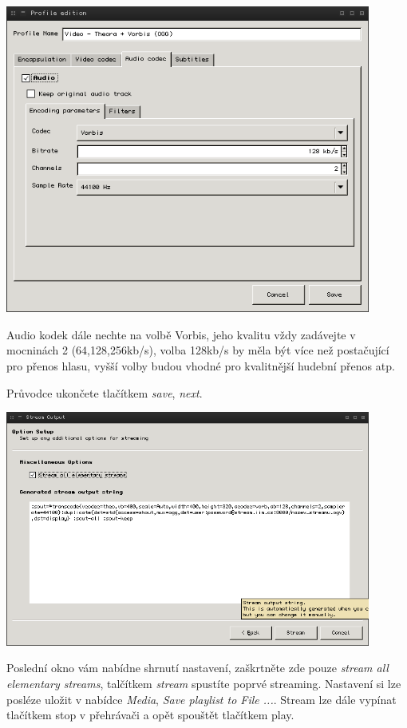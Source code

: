 \documentclass[11pt]{article} %
\begin{document}
\begin{center}
\includegraphics[width=0.9\textwidth]{10}
\end{center}

Audio kodek dále nechte na volbě Vorbis, jeho kvalitu vždy zadávejte v mocninách 2 (64,128,256kb/s), volba 128kb/s by měla být více než postačující pro přenos hlasu, vyšší volby budou vhodné pro kvalitnější hudební přenos atp.

Průvodce ukončete tlačítkem {\em save}, {\em next}.



\begin{center}
\includegraphics[width=0.9\textwidth]{11}
\end{center}

Poslední okno vám nabídne shrnutí nastavení, zaškrtněte zde pouze {\em stream all elementary streams}, talčítkem {\em stream} spustíte poprvé streaming. Nastavení si lze posléze uložit v nabídce {\em Media}, {\em Save playlist to File ...}. Stream lze dále vypínat tlačítkem stop v přehrávači a opět spouštět tlačítkem play.
\end{document}

